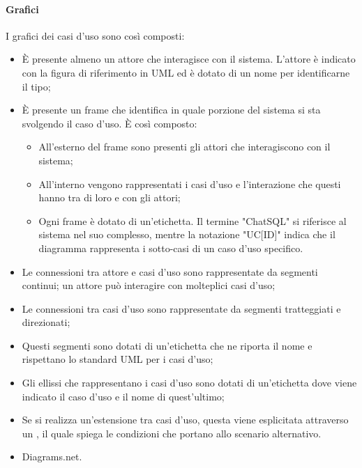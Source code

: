 \paragraph{Grafici}
I grafici dei casi d'uso sono così composti:
\begin{itemize}
  \item È presente almeno un attore che interagisce con il sistema. L'attore è indicato con la figura di riferimento in UML ed è dotato di un nome per identificarne il tipo;
  \item È presente un frame che identifica in quale porzione del sistema si sta svolgendo il caso d'uso. È così composto:
  \begin{itemize}
    \item All'esterno del frame sono presenti gli attori che interagiscono con il sistema;
    \item All'interno vengono rappresentati i casi d'uso e l'interazione che questi hanno tra di loro e con gli attori;
    \item Ogni frame è dotato di un'etichetta. Il termine "ChatSQL" si riferisce al sistema nel suo complesso, mentre la notazione "UC[ID]" indica che il diagramma rappresenta i sotto-casi di un caso d'uso specifico.
  \end{itemize}
  \item Le connessioni tra attore e casi d'uso sono rappresentate da segmenti continui; un attore può interagire con molteplici casi d'uso;
  \item Le connessioni tra casi d'uso sono rappresentate da segmenti tratteggiati e direzionati;
  \item Questi segmenti sono dotati di un'etichetta che ne riporta il nome e rispettano lo standard UML per i casi d'uso;
  \item Gli ellissi che rappresentano i casi d'uso sono dotati di un'etichetta dove viene indicato il caso d'uso e il nome di quest'ultimo;
  \item Se si realizza un'estensione tra casi d'uso, questa viene esplicitata attraverso un , il quale spiega le condizioni che portano allo scenario alternativo.
\end{itemize}

\IntroStrumenti
\begin{itemize}
  \item Diagrams.net.
\end{itemize}

